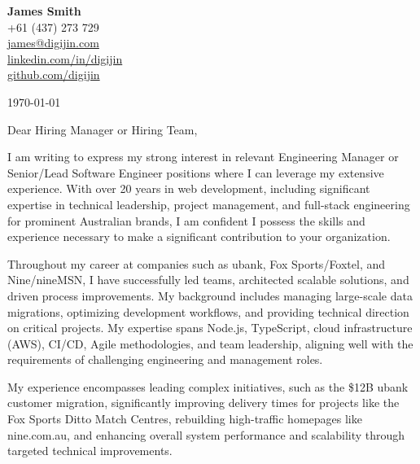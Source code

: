 \documentclass[a4paper,10pt]{article}
\begin{document}
\begin{flushleft}
\textbf{James Smith} \\
+61 (437) 273 729 \\
\href{mailto:james@digijin.com}{james@digijin.com} \\
\href{https://www.linkedin.com/in/digijin/}{linkedin.com/in/digijin} \\
\href{https://github.com/digijin}{github.com/digijin}
\end{flushleft}

\vspace{1em}

\today

\vspace{2em} %

Dear Hiring Manager or Hiring Team,

\vspace{1em}

I am writing to express my strong interest in relevant Engineering Manager or Senior/Lead Software Engineer positions where I can leverage my extensive experience. With over 20 years in web development, including significant expertise in technical leadership, project management, and full-stack engineering for prominent Australian brands, I am confident I possess the skills and experience necessary to make a significant contribution to your organization.

\vspace{1em}

Throughout my career at companies such as ubank, Fox Sports/Foxtel, and Nine/nineMSN, I have successfully led teams, architected scalable solutions, and driven process improvements. My background includes managing large-scale data migrations, optimizing development workflows, and providing technical direction on critical projects. My expertise spans Node.js, TypeScript, cloud infrastructure (AWS), CI/CD, Agile methodologies, and team leadership, aligning well with the requirements of challenging engineering and management roles.

\vspace{1em}

My experience encompasses leading complex initiatives, such as the \$12B ubank customer migration, significantly improving delivery times for projects like the Fox Sports Ditto Match Centres, rebuilding high-traffic homepages like nine.com.au, and enhancing overall system performance and scalability through targeted technical improvements.
\end{document}
